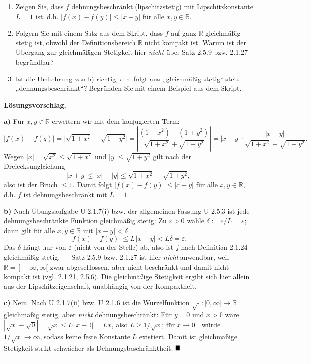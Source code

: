 \documentclass[a4paper,11pt]{article}
\providecommand{\qed}{\hfill\ensuremath{\blacksquare}}
\begin{document}
\begin{enumerate}[label=\alph*)]
  \item Zeigen Sie, dass $f$ dehnungsbeschränkt (lipschitzstetig) mit Lipschitzkonstante $L=1$ ist, d.h. $|f(x)-f(y)|\le|x-y|$ für alle $x,y\in\mathbb{R}$.
  \item Folgern Sie mit einem Satz aus dem Skript, dass $f$ auf ganz $\mathbb{R}$ gleichmäßig stetig ist, obwohl der Definitionsbereich $\mathbb{R}$ nicht kompakt ist. Warum ist der Übergang zur gleichmäßigen Stetigkeit hier \emph{nicht} über Satz 2.5.9 bzw. 2.1.27 begründbar?
  \item Ist die Umkehrung von b) richtig, d.h. folgt aus „gleichmäßig stetig“ stets „dehnungsbeschränkt“? Begründen Sie mit einem Beispiel aus dem Skript.
\end{enumerate}\par\smallskip
\textbf{L\"osungsvorschlag.}\par
\textbf{a)} Für $x,y\in\mathbb{R}$ erweitern wir mit dem konjugierten Term:
\[|f(x)-f(y)|=\bigl|\sqrt{1+x^2}-\sqrt{1+y^2}\bigr|=\left|\frac{(1+x^2)-(1+y^2)}{\sqrt{1+x^2}+\sqrt{1+y^2}}\right|=|x-y|\cdot\frac{|x+y|}{\sqrt{1+x^2}+\sqrt{1+y^2}}.\]
Wegen $|x|=\sqrt{x^2}\le\sqrt{1+x^2}$ und $|y|\le\sqrt{1+y^2}$ gilt nach der Dreiecksungleichung
\[|x+y|\le|x|+|y|\le\sqrt{1+x^2}+\sqrt{1+y^2},\]
also ist der Bruch $\le1$. Damit folgt $|f(x)-f(y)|\le|x-y|$ für alle $x,y\in\mathbb{R}$, d.h. $f$ ist dehnungsbeschränkt mit $L=1$.

\textbf{b)} Nach Übungsaufgabe U 2.1.7(i) bzw. der allgemeinen Fassung U 2.5.3 ist jede dehnungsbeschränkte Funktion gleichmäßig stetig: Zu $\varepsilon>0$ wähle $\delta:=\varepsilon/L=\varepsilon$; dann gilt für alle $x,y\in\mathbb{R}$ mit $|x-y|<\delta$
\[|f(x)-f(y)|\le L\,|x-y|<L\delta=\varepsilon.\]
Das $\delta$ hängt nur von $\varepsilon$ (nicht von der Stelle) ab, also ist $f$ nach Definition 2.1.24 gleichmäßig stetig. — Satz 2.5.9 bzw. 2.1.27 ist hier \emph{nicht} anwendbar, weil $\mathbb{R}=\,]-\infty,\infty[$ zwar abgeschlossen, aber nicht beschränkt und damit nicht kompakt ist (vgl. 2.1.21, 2.5.6). Die gleichmäßige Stetigkeit ergibt sich hier allein aus der Lipschitzeigenschaft, unabhängig von der Kompaktheit.

\textbf{c)} Nein. Nach U 2.1.7(ii) bzw. U 2.1.6 ist die Wurzelfunktion $\sqrt{\cdot}:[0,\infty[\to\mathbb{R}$ gleichmäßig stetig, aber \emph{nicht} dehnungsbeschränkt: Für $y=0$ und $x>0$ wäre $|\sqrt{x}-\sqrt0|=\sqrt{x}\le L\,|x-0|=Lx$, also $L\ge 1/\sqrt{x}$; für $x\to0^+$ würde $1/\sqrt{x}\to\infty$, sodass keine feste Konstante $L$ existiert. Damit ist gleichmäßige Stetigkeit strikt schwächer als Dehnungsbeschränktheit. $\qed$\par\bigskip\hrule\bigskip
\end{document}
